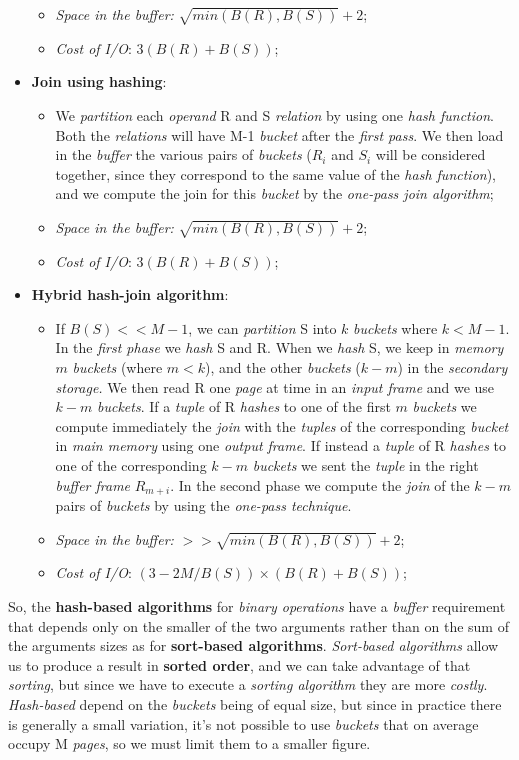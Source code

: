 \documentclass{article}
\begin{document}
\begin{itemize}
\begin{itemize}
\item \emph{Space in the buffer:} $\sqrt{min(B(R),B(S))}+2$;
\item \emph{Cost of I/O}: $3(B(R)+B(S))$;
\end{itemize}
\item \textbf{Join using hashing}:
\begin{itemize}
\item We \emph{partition} each \emph{operand} R and S \emph{relation} by using one \emph{hash function}. Both the \emph{relations} will have M-1 \emph{bucket} after the \emph{first pass}. We then load in the \emph{buffer} the various pairs of \emph{buckets} ($R_i$ and $S_i$ will be considered together, since they correspond to the same value of the \emph{hash function}), and we compute the join for this \emph{bucket} by the \emph{one-pass join algorithm};
\item \emph{Space in the buffer:} $\sqrt{min(B(R),B(S))}+2$;
\item \emph{Cost of I/O}: $3(B(R)+B(S))$;
\end{itemize}
\item \textbf{Hybrid hash-join algorithm}:
\begin{itemize}
\item  If $B(S) << M-1$, we can \emph{partition} S into $k$ \emph{buckets} where $k < M-1$. In the \emph{first phase} we \emph{hash} S and R. When we \emph{hash} S, we keep in \emph{memory} $m$ \emph{buckets} (where $m < k$), and the other \emph{buckets} ($k-m$) in the \emph{secondary storage.} We then read R one \emph{page} at time in an \emph{input frame} and we use $k-m$ \emph{buckets}. If a \emph{tuple} of R \emph{hashes} to one of the first $m$ \emph{buckets} we compute immediately the \emph{join} with the \emph{tuples} of the corresponding \emph{bucket} in \emph{main memory} using one \emph{output frame}. If instead a \emph{tuple} of R \emph{hashes} to one of the corresponding $k-m$ \emph{buckets} we sent the \emph{tuple} in the right \emph{buffer frame} $R_{m+i}$. In the second phase we compute the \emph{join} of the $k-m$ pairs of \emph{buckets} by using the \emph{one-pass technique}. 
\item \emph{Space in the buffer:} $>>\sqrt{min(B(R),B(S))}+2$;
\item \emph{Cost of I/O}: $(3-2M/B(S)) \times (B(R)+B(S))$;
\end{itemize}
\end{itemize}
So, the \textbf{hash-based algorithms} for \emph{binary operations} have a \emph{buffer} requirement that depends only on the smaller of the two arguments rather than on the sum of the arguments sizes as for \textbf{sort-based algorithms}. \emph{Sort-based algorithms} allow us to produce a result in \textbf{sorted order}, and we can take advantage of that \emph{sorting}, but since we have to execute a \emph{sorting algorithm} they are more \emph{costly}. \emph{Hash-based} depend on the \emph{buckets} being of equal size, but since in practice there is generally a small variation, it's not possible to use \emph{buckets} that on average occupy M \emph{pages}, so we must limit them to a smaller figure. 
\end{document}
